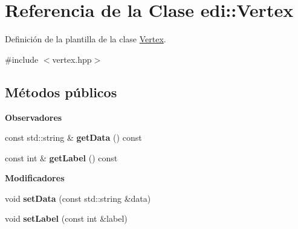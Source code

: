\hypertarget{classedi_1_1Vertex}{}\section{Referencia de la Clase edi\+:\+:Vertex}
\label{classedi_1_1Vertex}


Definición de la plantilla de la clase \hyperlink{classedi_1_1Vertex}{Vertex}.  




{\ttfamily \#include $<$vertex.\+hpp$>$}

\subsection*{Métodos públicos}
\begin{Indent}{\bf Observadores}\par
\begin{DoxyCompactItemize}
\item 
\hypertarget{classedi_1_1Vertex_a6d4f5bef9306c91ccfa6beeee12a9216}{}const std\+::string \& {\bfseries get\+Data} () const \label{classedi_1_1Vertex_a6d4f5bef9306c91ccfa6beeee12a9216}

\item 
\hypertarget{classedi_1_1Vertex_a032637afec6496f48284b463a23ce542}{}const int \& {\bfseries get\+Label} () const \label{classedi_1_1Vertex_a032637afec6496f48284b463a23ce542}

\end{DoxyCompactItemize}
\end{Indent}
\begin{Indent}{\bf Modificadores}\par
\begin{DoxyCompactItemize}
\item 
\hypertarget{classedi_1_1Vertex_ac54513ccf42164308239c493e7ef84d1}{}void {\bfseries set\+Data} (const std\+::string \&data)\label{classedi_1_1Vertex_ac54513ccf42164308239c493e7ef84d1}

\item 
\hypertarget{classedi_1_1Vertex_af87a2711c62dce91a06bc5d475cd250a}{}void {\bfseries set\+Label} (const int \&label)\label{classedi_1_1Vertex_af87a2711c62dce91a06bc5d475cd250a}

\end{DoxyCompactItemize}
\end{Indent}
